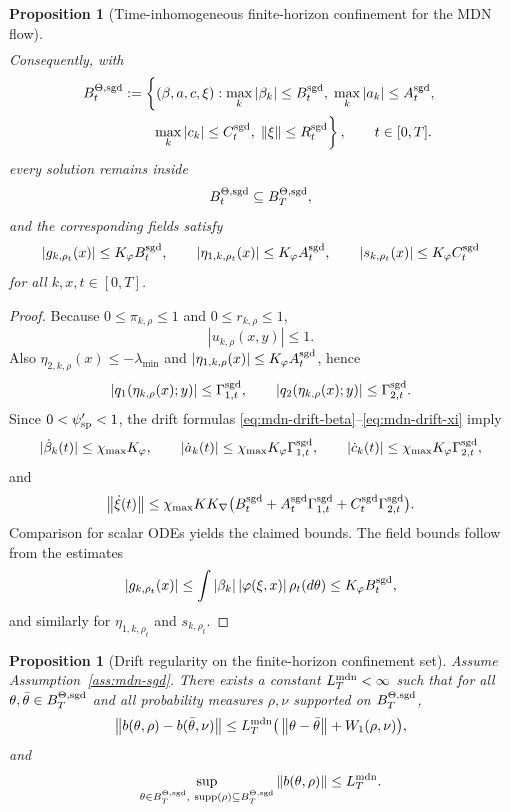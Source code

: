 \documentclass[11pt]{article}
\newtheorem{proposition}[theorem]{Proposition}
\theoremstyle{definition}
\newcommand{\supp}{\mathrm{supp}}
\newcommand{\norm}[1]{\left\lVert #1 \right\rVert}
\begin{document}
\begin{proposition}[Time-inhomogeneous finite-horizon confinement for the MDN flow]
\[\begin{aligned}
  \end{aligned}
\]
Consequently, with
\[
  \begin{aligned}
    B_t^{\Theta,\rm sgd}
    &:=
    \left\{
      (\beta,a,c,\xi):
      \max_k|\beta_k|\le B_t^{\rm sgd},\;
      \max_k|a_k|\le A_t^{\rm sgd},
    \right.
    \\
    &\qquad\left.
      \max_k|c_k|\le C_t^{\rm sgd},\;
      \norm{\xi}\le R_t^{\rm sgd}
    \right\},
    \qquad t\in[0,T].
  \end{aligned}
\]
every solution remains inside
\[
  B_t^{\Theta,\rm sgd}\subseteq B_T^{\Theta,\rm sgd},
\]
and the corresponding fields satisfy
\[
  |g_{k,\rho_t}(x)|\le K_\varphi B_t^{\rm sgd},
  \qquad
  |\eta_{1,k,\rho_t}(x)|\le K_\varphi A_t^{\rm sgd},
  \qquad
  |s_{k,\rho_t}(x)|\le K_\varphi C_t^{\rm sgd}
\]
for all $k,x,t\in[0,T]$.
\end{proposition}

\begin{proof}
Because $0\le \pi_{k,\rho}\le 1$ and $0\le r_{k,\rho}\le 1$,
\[
  |u_{k,\rho}(x,y)|\le 1.
\]
Also $\eta_{2,k,\rho}(x)\le -\lambda_{\min}$ and
$|\eta_{1,k,\rho}(x)|\le K_\varphi A_t^{\rm sgd}$, hence
\[
  |q_1(\eta_{k,\rho}(x);y)|\le \Gamma_{1,t}^{\rm sgd},
  \qquad
  |q_2(\eta_{k,\rho}(x);y)|\le \Gamma_{2,t}^{\rm sgd}.
\]
Since $0<\psi_{\rm sp}'<1$, the drift formulas
\eqref{eq:mdn-drift-beta}--\eqref{eq:mdn-drift-xi} imply
\[
  |\dot\beta_k(t)|\le \chi_{\max}K_\varphi,
  \qquad
  |\dot a_k(t)|\le \chi_{\max}K_\varphi\Gamma_{1,t}^{\rm sgd},
  \qquad
  |\dot c_k(t)|\le \chi_{\max}K_\varphi\Gamma_{2,t}^{\rm sgd},
\]
and
\[
  \norm{\dot\xi(t)}
  \le
  \chi_{\max}K K_\nabla
  \big(
    B_t^{\rm sgd}
    +
    A_t^{\rm sgd}\Gamma_{1,t}^{\rm sgd}
    +
    C_t^{\rm sgd}\Gamma_{2,t}^{\rm sgd}
  \big).
\]
Comparison for scalar ODEs yields the claimed bounds. The field bounds follow
from the estimates
\[
  |g_{k,\rho_t}(x)|
  \le
  \int |\beta_k|\,|\varphi(\xi,x)|\,\rho_t(d\theta)
  \le
  K_\varphi B_t^{\rm sgd},
\]
and similarly for $\eta_{1,k,\rho_t}$ and $s_{k,\rho_t}$.
\end{proof}

\begin{proposition}[Drift regularity on the finite-horizon confinement set]
\label{prop:mdn-drift-regularity}
Assume Assumption~\ref{ass:mdn-sgd}. There exists a constant
$L_T^{\rm mdn}<\infty$ such that for all
$\theta,\bar\theta\in B_T^{\Theta,\rm sgd}$ and all probability measures
$\rho,\nu$ supported on $B_T^{\Theta,\rm sgd}$,
\begin{equation}
  \norm{b(\theta,\rho)-b(\bar\theta,\nu)}
  \le
  L_T^{\rm mdn}\big(\norm{\theta-\bar\theta}+W_1(\rho,\nu)\big),
  \label{eq:mdn-drift-lipschitz}
\end{equation}
and
\[
  \sup_{\theta\in B_T^{\Theta,\rm sgd},\ \supp(\rho)\subseteq B_T^{\Theta,\rm sgd}}
  \norm{b(\theta,\rho)}
  \le
  L_T^{\rm mdn}.
\]
\end{proposition}
\end{document}
